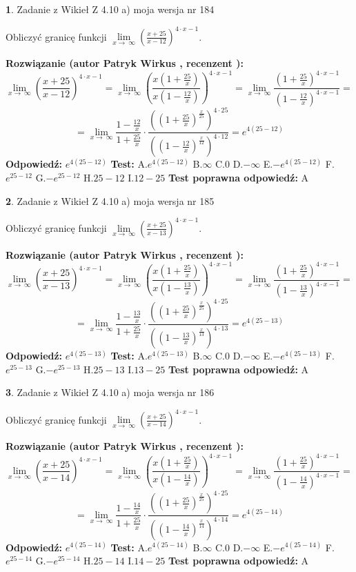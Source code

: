 \documentclass[12pt, a4paper]{article}
\theoremstyle{definition} %
\newtheorem{zad}{}
\newcommand{\zadStart}[1]{\begin{zad}#1\newline}
\newcommand{\zadStop}{\end{zad}}
\newcommand{\rozwStart}[2]{\noindent \textbf{Rozwiązanie (autor #1 , recenzent #2): }\newline}
\newcommand{\rozwStop}{\newline}
\newcommand{\odpStart}{\noindent \textbf{Odpowiedź:}\newline}
\newcommand{\odpStop}{\newline}
\newcommand{\testStart}{\noindent \textbf{Test:}\newline}
\newcommand{\testStop}{\newline}
\newcommand{\kluczStart}{\noindent \textbf{Test poprawna odpowiedź:}\newline}
\newcommand{\kluczStop}{\newline}
\begin{document}
\zadStart{Zadanie z Wikieł Z 4.10 a) moja wersja nr 184}


Obliczyć granicę funkcji  $\lim\limits_{x\to\ \infty}(\frac{x+25}{x-12})^{4\cdot x-1}$.
\zadStop
\rozwStart{Patryk Wirkus}{}
$$\lim\limits_{x\to\ \infty}(\frac{x+25}{x-12})^{4\cdot x-1} = \lim\limits_{x\to\ \infty}(\frac{x(1+\frac{25}{x})}{x(1-\frac{12}{x})})^{4\cdot x-1}=\lim\limits_{x\to\ \infty}\frac{(1+\frac{25}{x})^{4\cdot x-1}}{(1-\frac{12}{x})^{4\cdot x-1}}=$$
$$=\lim\limits_{x\to\ \infty}\frac{1-\frac{12}{x}}{1+\frac{25}{x}}\cdot\frac{((1+\frac{25}{x})^{\frac{x}{25}})^{4\cdot25}}{((1-\frac{12}{x})^{\frac{x}{12}})^{4\cdot12}}=e^{4(25-12)}$$
\rozwStop
\odpStart
$e^{4(25-12)}$
\odpStop
\testStart
A.$e^{4(25-12)}$ B.$\infty$ C.$0$ D.$-\infty$ E.$-e^{4(25-12)}$
F.$e^{25-12}$ G.$-e^{25-12}$
H.$25-12$
I.$12-25$
\testStop
\kluczStart
A
\kluczStop



\zadStart{Zadanie z Wikieł Z 4.10 a) moja wersja nr 185}


Obliczyć granicę funkcji  $\lim\limits_{x\to\ \infty}(\frac{x+25}{x-13})^{4\cdot x-1}$.
\zadStop
\rozwStart{Patryk Wirkus}{}
$$\lim\limits_{x\to\ \infty}(\frac{x+25}{x-13})^{4\cdot x-1} = \lim\limits_{x\to\ \infty}(\frac{x(1+\frac{25}{x})}{x(1-\frac{13}{x})})^{4\cdot x-1}=\lim\limits_{x\to\ \infty}\frac{(1+\frac{25}{x})^{4\cdot x-1}}{(1-\frac{13}{x})^{4\cdot x-1}}=$$
$$=\lim\limits_{x\to\ \infty}\frac{1-\frac{13}{x}}{1+\frac{25}{x}}\cdot\frac{((1+\frac{25}{x})^{\frac{x}{25}})^{4\cdot25}}{((1-\frac{13}{x})^{\frac{x}{13}})^{4\cdot13}}=e^{4(25-13)}$$
\rozwStop
\odpStart
$e^{4(25-13)}$
\odpStop
\testStart
A.$e^{4(25-13)}$ B.$\infty$ C.$0$ D.$-\infty$ E.$-e^{4(25-13)}$
F.$e^{25-13}$ G.$-e^{25-13}$
H.$25-13$
I.$13-25$
\testStop
\kluczStart
A
\kluczStop



\zadStart{Zadanie z Wikieł Z 4.10 a) moja wersja nr 186}


Obliczyć granicę funkcji  $\lim\limits_{x\to\ \infty}(\frac{x+25}{x-14})^{4\cdot x-1}$.
\zadStop
\rozwStart{Patryk Wirkus}{}
$$\lim\limits_{x\to\ \infty}(\frac{x+25}{x-14})^{4\cdot x-1} = \lim\limits_{x\to\ \infty}(\frac{x(1+\frac{25}{x})}{x(1-\frac{14}{x})})^{4\cdot x-1}=\lim\limits_{x\to\ \infty}\frac{(1+\frac{25}{x})^{4\cdot x-1}}{(1-\frac{14}{x})^{4\cdot x-1}}=$$
$$=\lim\limits_{x\to\ \infty}\frac{1-\frac{14}{x}}{1+\frac{25}{x}}\cdot\frac{((1+\frac{25}{x})^{\frac{x}{25}})^{4\cdot25}}{((1-\frac{14}{x})^{\frac{x}{14}})^{4\cdot14}}=e^{4(25-14)}$$
\rozwStop
\odpStart
$e^{4(25-14)}$
\odpStop
\testStart
A.$e^{4(25-14)}$ B.$\infty$ C.$0$ D.$-\infty$ E.$-e^{4(25-14)}$
F.$e^{25-14}$ G.$-e^{25-14}$
H.$25-14$
I.$14-25$
\testStop
\kluczStart
A
\kluczStop
\end{document}
